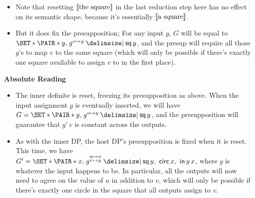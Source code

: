 \documentclass[10pt,fleqn]{article}
\begin{document}
%
%
\begin{minipage}[t]{0.5\textwidth} %
  \begin{itemize}
    \item
      Note that resetting $\llbracket \textrm{the square} \rrbracket$ in the last reduction
      step here has no effect on its semantic shape, because it's essentially
      $\llbracket \textrm{a square} \rrbracket$.
    \item
      But it does fix the presupposition; For any input $g$, $G$ will be equal
      to $\set{\pair{y}{g^{v\mapsto y}} \giv \cn{sq}\,y}$, and the presup will
      require all those $g$'s to map $v$ to the same square (which will only
      be possible if there's exactly one square available to assign $v$ to
      in the first place).
  \end{itemize} 
  \vspace{2em}
  \textbf{Absolute Reading}
  \begin{itemize}
    \item
      The inner definite is reset, freezing its presupposition as above. When
      the input assignment $g$ is eventually inserted, we will have $G =
      \set{\pair{y}{g^{v\mapsto y}} \giv \cn{sq}\,y}$, and the presupposition
      will guarantee that $g'\,v$ is constant across the outputs.
    \item
      As with the inner DP, the host DP's presupposition is fixed when it is
      reset. This time, we have $G' = \set{\pair{x}{g^{\substack{u\mapsto x\\
      v\mapsto y}}} \giv \cn{sq}\,y,\ \cn{circ}\,x,\ \cn{in}\,y\,x}$, where
      $g$ is whatever the input happens to be. In particular, all the outputs
      will now need to agree on the value of $u$ in addition to $v$, which
      will only be possible if there's exactly one circle in the square that
      all outputs assign to $v$.
  \end{itemize}
\end{minipage}

\newpage
\end{document}
